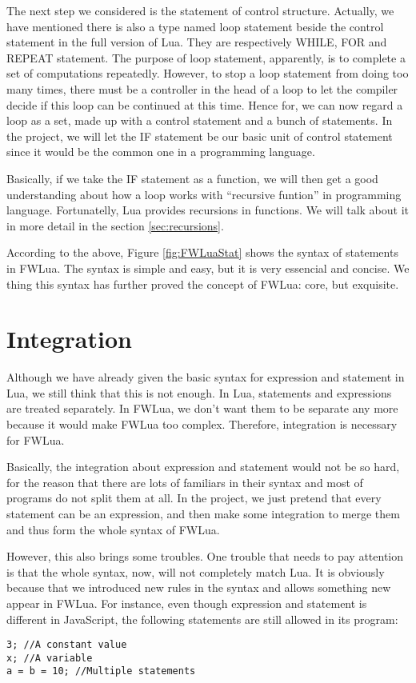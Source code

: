 The next step we considered is the statement of control structure. Actually, we have mentioned there is also a type named loop statement beside the control statement in the full version of Lua. They are respectively WHILE, FOR and REPEAT statement. The purpose of loop statement, apparently, is to complete a set of computations repeatedly. However, to stop a loop statement from doing too many times, there must be a controller in the head of a loop to let the compiler decide if this loop can be continued at this time. Hence for, we can now regard a loop as a set, made up with a control statement and a bunch of statements. In the project, we will let the IF statement be our basic unit of control statement since it would be the common one in a programming language.

Basically, if we take the IF statement as a function, we will then get a good understanding about how a loop works with ``recursive funtion'' in programming language. Fortunatelly, Lua provides recursions in functions. We will talk about it in more detail in the section \ref{sec:recursions}.

According to the above, Figure \ref{fig:FWLuaStat} shows the syntax of statements in FWLua. The syntax is simple and easy, but it is very essencial and concise. We thing this syntax has further proved the concept of FWLua: core, but exquisite.

\section{Integration}
Although we have already given the basic syntax for expression and statement in Lua, we still think that this is not enough. In Lua, statements and expressions are treated separately. In FWLua, we don't want them to be separate any more because it would make FWLua too complex. Therefore, integration is necessary for FWLua.

Basically, the integration about expression and statement would not be so hard, for the reason that there are lots of familiars in their syntax and most of programs do not split them at all. In the project, we just pretend that every statement can be an expression, and then make some integration to merge them and thus form the whole syntax of FWLua. 

However, this also brings some troubles. One trouble that needs to pay attention is that the whole syntax, now, will not completely match Lua. It is obviously because that we introduced new rules in the syntax and allows something new appear in FWLua. For instance, even though expression and statement is different in JavaScript, the following statements are still allowed in its program:
\begin{flushleft}
\tt 3;   //A constant value\\
\tt x;   //A variable\\
\tt a = b = 10;   //Multiple statements\\
\end{flushleft}

